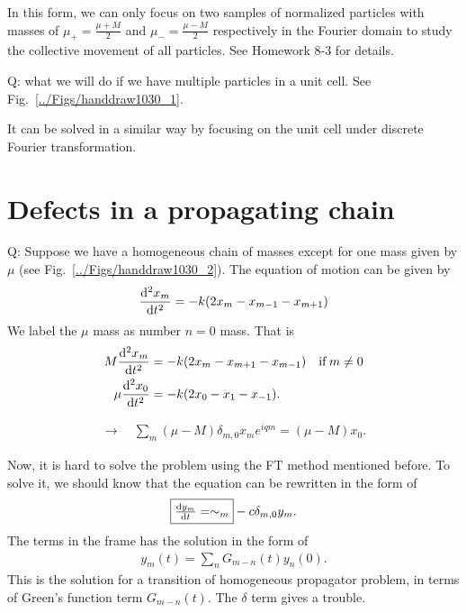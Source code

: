 In this form, we can only focus on two samples of normalized particles with masses of $ \mu_+=\frac{\mu + M}{2} $ and $ \mu_-=\frac{\mu-M}{2} $ respectively in the Fourier domain to study the collective movement of all particles. See Homework 8-3 for details. 

Q: what we will do if we have multiple particles in a unit cell. See Fig.~\ref{../Figs/handdraw1030_1}. 

It can be solved in a similar way by focusing on the unit cell under discrete Fourier transformation. 

\section{Defects in a propagating chain}\label{sec:defects}
Q: Suppose we have a homogeneous chain of masses except for one mass given by $ \mu $ (see Fig.~\ref{../Figs/handdraw1030_2}). 
The equation of motion can be given by
\begin{align}
[M+(\mu - M)\delta_{mn} ]\sdt{x_m} = -k(2x_m - x_{m-1}-x_{m+1})
\end{align}
We label the $ \mu  $ mass as number $ n=0 $ mass. That is
\begin{align}
M\frac{{\mathrm d}^2 {x_m}}{{\mathrm d}t^2}  &= -k (2x_m - x_{m+1}-x_{m-1})\quad \mathrm{if} \, m\neq 0 \\
\mu \frac{{\mathrm d}^2 {x_0}}{{\mathrm d}t^2} &= -k (2x_0 - x_1 - x_{-1}).
\end{align}

\begin{align}
\rightarrow \quad \sum_m (\mu - M)\delta_{m,0} x_m e^{iqm}= (\mu-M) x_0.
\end{align}

Now, it is hard to solve the problem using the FT method mentioned before. To solve it, we should know that the equation can be rewritten in the form of
\begin{align}
\fbox{$\frac{{\mathrm d} {y_m}}{{\mathrm d}t}=  \sim_m$} -c \delta_{m,0}y_m. \label{eq:nonhomogeneous}
\end{align}
The terms in the frame has the solution in the form of
\begin{align}
y_m(t)= \sum_n G_{m-n}(t)y_n (0).
\end{align}
This is the solution for a transition of homogeneous propagator problem, in terms of Green's function term $ G_{m-n}(t) $. The $ \delta $ term gives a trouble. 

